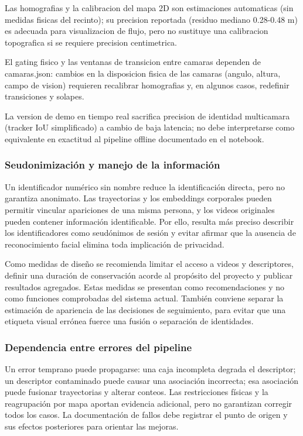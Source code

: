 \documentclass[12pt,letterpaper]{article}
\begin{document}
Las homografias y la calibracion del mapa 2D son estimaciones automaticas (sin medidas fisicas del recinto); su precision reportada (residuo mediano 0.28-0.48 m) es adecuada para visualizacion de flujo, pero no sustituye una calibracion topografica si se requiere precision centimetrica.


El gating fisico y las ventanas de transicion entre camaras dependen de camaras.json: cambios en la disposicion fisica de las camaras (angulo, altura, campo de vision) requieren recalibrar homografias y, en algunos casos, redefinir transiciones y solapes.


La version de demo en tiempo real sacrifica precision de identidad multicamara (tracker IoU simplificado) a cambio de baja latencia; no debe interpretarse como equivalente en exactitud al pipeline offline documentado en el notebook.


\subsubsection{Seudonimización y manejo de la información}
Un identificador numérico sin nombre reduce la identificación directa, pero no garantiza anonimato. Las trayectorias y los embeddings corporales pueden permitir vincular apariciones de una misma persona, y los videos originales pueden contener información identificable. Por ello, resulta más preciso describir los identificadores como seudónimos de sesión y evitar afirmar que la ausencia de reconocimiento facial elimina toda implicación de privacidad.

Como medidas de diseño se recomienda limitar el acceso a videos y descriptores, definir una duración de conservación acorde al propósito del proyecto y publicar resultados agregados. Estas medidas se presentan como recomendaciones y no como funciones comprobadas del sistema actual. También conviene separar la estimación de apariencia de las decisiones de seguimiento, para evitar que una etiqueta visual errónea fuerce una fusión o separación de identidades.

\subsubsection{Dependencia entre errores del pipeline}
Un error temprano puede propagarse: una caja incompleta degrada el descriptor; un descriptor contaminado puede causar una asociación incorrecta; esa asociación puede fusionar trayectorias y alterar conteos. Las restricciones físicas y la reagrupación por mapa aportan evidencia adicional, pero no garantizan corregir todos los casos. La documentación de fallos debe registrar el punto de origen y sus efectos posteriores para orientar las mejoras.
\end{document}
